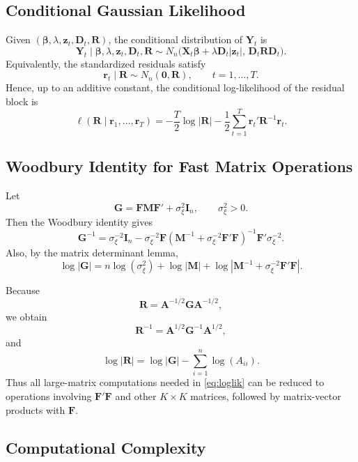 \documentclass[11pt]{article}
\newcommand{\bY}{\mathbf{Y}}
\newcommand{\bX}{\mathbf{X}}
\newcommand{\bD}{\mathbf{D}}
\newcommand{\bF}{\mathbf{F}}
\newcommand{\bG}{\mathbf{G}}
\newcommand{\bM}{\mathbf{M}}
\newcommand{\bR}{\mathbf{R}}
\newcommand{\bA}{\mathbf{A}}
\newcommand{\bz}{\mathbf{z}}
\newcommand{\br}{\mathbf{r}}
\newcommand{\bzero}{\mathbf{0}}
\newcommand{\I}{\mathbf{I}}
\begin{document}
\subsection{Conditional Gaussian Likelihood}

Given $(\bm{\beta}, \lambda, \bz_t, \bD_t, \bR)$, the conditional distribution
of $\bY_t$ is
\[
\bY_t \mid \bm{\beta}, \lambda, \bz_t, \bD_t, \bR
\sim
N_n\bigl(
\bX_t \bm{\beta} + \lambda \bD_t |\bz_t|,
\,
\bD_t \bR \bD_t
\bigr).
\]
Equivalently, the standardized residuals satisfy
\[
\br_t \mid \bR \sim N_n(\bzero, \bR),
\qquad
t = 1, \ldots, T.
\]
Hence, up to an additive constant, the conditional log-likelihood of the
residual block is
\begin{equation}
\ell(\bR \mid \br_1, \ldots, \br_T)
=
-\frac{T}{2} \log |\bR|
-\frac{1}{2} \sum_{t=1}^T \br_t' \bR^{-1} \br_t.
\label{eq:loglik}
\end{equation}

\subsection{Woodbury Identity for Fast Matrix Operations}

Let
\[
\bG = \bF \bM \bF' + \sigma_\xi^2 \I_n,
\qquad
\sigma_\xi^2 > 0.
\]
Then the Woodbury identity gives
\begin{equation}
\bG^{-1}
=
\sigma_\xi^{-2} \I_n
- \sigma_\xi^{-2} \bF
\left(
\bM^{-1} + \sigma_\xi^{-2} \bF' \bF
\right)^{-1}
\bF' \sigma_\xi^{-2}.
\label{eq:woodbury}
\end{equation}
Also, by the matrix determinant lemma,
\begin{equation}
\log |\bG|
=
n \log(\sigma_\xi^2)
+ \log |\bM|
+ \log \left|
\bM^{-1} + \sigma_\xi^{-2} \bF' \bF
\right|.
\label{eq:detg}
\end{equation}

Because
\[
\bR = \bA^{-1/2} \bG \bA^{-1/2},
\]
we obtain
\begin{equation}
\bR^{-1} = \bA^{1/2} \bG^{-1} \bA^{1/2},
\label{eq:rinv}
\end{equation}
and
\begin{equation}
\log |\bR| = \log |\bG| - \sum_{i=1}^n \log(A_{ii}).
\label{eq:logdetr}
\end{equation}
Thus all large-matrix computations needed in \eqref{eq:loglik} can be reduced to
operations involving $\bF' \bF$ and other $K \times K$ matrices, followed by
matrix-vector products with $\bF$.

\subsection{Computational Complexity}
\end{document}
